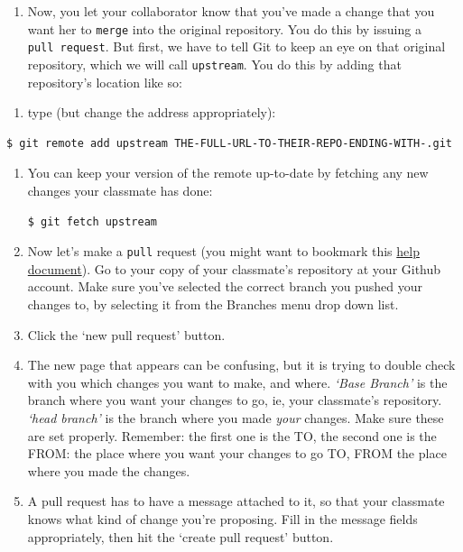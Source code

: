\documentclass[english,]{book}
\providecommand{\tightlist}{%
  \setlength{\itemsep}{0pt}\setlength{\parskip}{0pt}}
\begin{document}
\begin{enumerate}
\def\labelenumi{\arabic{enumi}.}
\setcounter{enumi}{6}
\tightlist
\item
  Now, you let your collaborator know that you've made a change that you
  want her to \texttt{merge} into the original repository. You do this
  by issuing a \texttt{pull\ request}. But first, we have to tell Git to
  keep an eye on that original repository, which we will call
  \texttt{upstream}. You do this by adding that repository's location
  like so:
\end{enumerate}

\begin{enumerate}
\def\labelenumi{\alph{enumi}.}
\tightlist
\item
  type (but change the address appropriately):
\end{enumerate}

\begin{verbatim}
$ git remote add upstream THE-FULL-URL-TO-THEIR-REPO-ENDING-WITH-.git
\end{verbatim}

\begin{enumerate}
\def\labelenumi{\alph{enumi}.}
\setcounter{enumi}{1}
\item
  You can keep your version of the remote up-to-date by fetching any new
  changes your classmate has done:

\begin{verbatim}
$ git fetch upstream
\end{verbatim}
\item
  Now let's make a \texttt{pull} request (you might want to bookmark
  this
  \href{https://help.github.com/articles/creating-a-pull-request/}{help
  document}). Go to your copy of your classmate's repository at your
  Github account. Make sure you've selected the correct branch you
  pushed your changes to, by selecting it from the Branches menu drop
  down list.
\item
  Click the `new pull request' button.
\item
  The new page that appears can be confusing, but it is trying to double
  check with you which changes you want to make, and where. \emph{`Base
  Branch'} is the branch where you want your changes to go, ie, your
  classmate's repository. \emph{`head branch'} is the branch where you
  made \emph{your} changes. Make sure these are set properly. Remember:
  the first one is the TO, the second one is the FROM: the place where
  you want your changes to go TO, FROM the place where you made the
  changes.
\item
  A pull request has to have a message attached to it, so that your
  classmate knows what kind of change you're proposing. Fill in the
  message fields appropriately, then hit the `create pull request'
  button.
\end{enumerate}
\end{document}
